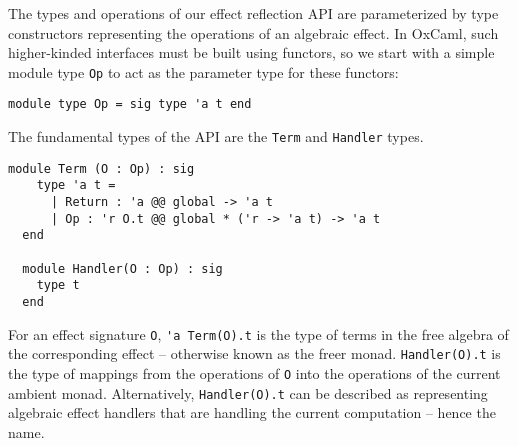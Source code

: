 \documentclass[acmsmall, screen, nonacm]{acmart}
\theoremstyle{definition}
\begin{document}
The types and operations of our effect reflection API are parameterized
by type constructors representing the operations of an algebraic
effect. In OxCaml, such higher-kinded interfaces must be built using
functors, so we start with a simple module type
\lstinline[style=oxcaml]{Op} to act as the parameter type for these
functors:
\begin{lstlisting}[style=oxcaml]
  module type Op = sig type 'a t end
\end{lstlisting}
The fundamental types of the API are the \lstinline[style=oxcaml]{Term}
and \lstinline[style=oxcaml]{Handler} types.
\begin{lstlisting}[style=oxcaml]
  module Term (O : Op) : sig
    type 'a t =
      | Return : 'a @@ global -> 'a t
      | Op : 'r O.t @@ global * ('r -> 'a t) -> 'a t
  end

  module Handler(O : Op) : sig
    type t
  end
\end{lstlisting}
For an effect signature \lstinline[style=oxcaml]{O},
\lstinline[style=oxcaml]{'a Term(O).t} is the type of terms in the free
algebra of the corresponding effect -- otherwise known as the freer
monad\cite{kiselyov2015freer}. \lstinline[style=oxcaml]{Handler(O).t} is
the type of mappings from the operations of \lstinline[style=oxcaml]{O}
into the operations of the current ambient monad. Alternatively,
\lstinline[style=oxcaml]{Handler(O).t} can be described as representing
algebraic effect handlers that are handling the current computation --
hence the name.
\end{document}
